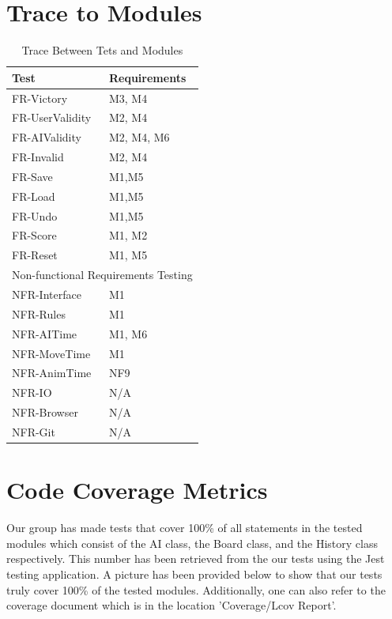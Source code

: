 \documentclass[12pt, titlepage]{article}
\begin{document}
\section{Trace to Modules}
\begin{table}[H]
	\begin{tabularx}{\textwidth}{ll}
		\toprule
		Test            & Requirements                          \\
		\midrule
		FR-Victory      & M3, M4                                \\
		FR-UserValidity & M2, M4                                \\
		FR-AIValidity   & M2, M4, M6                            \\
		FR-Invalid      & M2, M4                                \\
		FR-Save         & M1,M5                                 \\
		FR-Load         & M1,M5                                 \\
		FR-Undo         & M1,M5                                 \\
		FR-Score        & M1, M2                                \\
		FR-Reset        & M1, M5                                \\
		\midrule
		\multicolumn{2}{c}{Non-functional Requirements Testing} \\
		\midrule
		NFR-Interface   & M1                                    \\
		NFR-Rules       & M1                                    \\
		NFR-AITime      & M1, M6                                \\
		NFR-MoveTime    & M1                                    \\
		NFR-AnimTime    & NF9                                   \\
		NFR-IO          & N/A                                   \\
		NFR-Browser     & N/A                                   \\
		NFR-Git         & N/A                                   \\
		\bottomrule
	\end{tabularx}
	\caption{Trace Between Tets and Modules}
\end{table}


\section{Code Coverage Metrics}
\label{sec:ccm}
Our group has made tests that cover 100\% of all statements in the tested modules which consist of the AI class, the Board class, and the History class respectively. This number has been retrieved from the our tests  using the Jest testing application. A picture has been provided below to show that our tests truly cover 100\% of the tested modules. Additionally, one can also refer to the coverage document which is in the location 'Coverage/Lcov Report'. 
\end{document}

